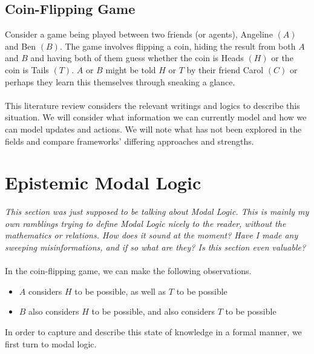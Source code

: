\documentclass[12pt, a4paper, twoside]{article}
\begin{document}
\subsection{Coin-Flipping Game}\label{intro_coinFlipping}
Consider a game being played between two friends (or agents), Angeline $(A)$
and Ben $(B)$.
The game involves flipping a coin, hiding the result from both $A$ and $B$ and
having both of them guess whether the coin is Heads $(H)$ or the coin is Tails
$(T)$.
$A$ or $B$ might be told $H$ or $T$ by their friend Carol $(C)$ or perhaps they
learn this themselves through sneaking a glance.\\
\\
This literature review considers the relevant writings and logics to describe
this situation.
We will consider what information we can currently model and how we can model
updates and actions.
We will note what has not been explored in the fields and compare frameworks'
differing approaches and strengths.

\section{Epistemic Modal Logic}\label{epistemic}
{\em This section was just supposed to be talking about Modal Logic.
This is mainly my own ramblings trying to define Modal Logic nicely to the
reader, without the mathematics or relations.
How does it sound at the moment?
Have I made any sweeping misinformations, and if so what are they?
Is this section even valuable?}\\
\\
In the coin-flipping game, we can make the following observations.
\begin{itemize}
	\item $A$ considers $H$ to be possible, as well as $T$ to be possible
	\item $B$ also considers $H$ to be possible, and also considers $T$ to be possible
\end{itemize}
In order to capture and describe this state of knowledge in a formal manner, we
first turn to modal logic.
\end{document}
